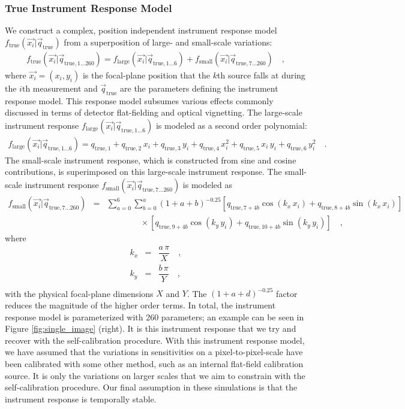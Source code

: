 \documentclass[preprint,pdftex]{aastex}
\newcommand{\true}{\text{true}}
\begin{document}
\subsubsection{True Instrument Response Model}
\label{sec:instrument_response_model}
We construct a complex, position independent instrument response model $f_\true(\vec{x_i} | \vec{q}_{\true})$ from a superposition of large- and small-scale variations:
\begin{eqnarray*}
f_\true(\vec{x_i} | \vec{q}_{\true, 1 \ldots 260}) = f_\text{large}(\vec{x_i} | \vec{q}_{\true, 1 \ldots 6}) + f_\text{small}(\vec{x_i} | \vec{q}_{\true, 7 \ldots 260}) \quad ,
\end{eqnarray*}
where $\vec{x_i} = (x_i, y_i)$ is the focal-plane position that the $k$th source falls at during the $i\text{th}$ measurement and $\vec{q}_\true$ are the parameters defining the instrument response model. This response model subsumes various effects commonly discussed in terms of detector flat-fielding and optical vignetting. The large-scale instrument response $f_\text{large}(\vec{x_i} | \vec{q}_{\true, 1 \ldots 6})$ is modeled as a second order polynomial:
\begin{eqnarray*}
f_\text{large}(\vec{x_i} | \vec{q}_{\true, 1 \ldots 6}) = q_{\true, 1} + q_{\true, 2} \, x_i + q_{\true, 3} \, y_i + q_{\true, 4} \, x_i^2 + q_{\true, 5} \, x_i \, y_i  + q_{\true, 6} \, y_i^2  \quad .
\end{eqnarray*}
The small-scale instrument response, which is constructed from sine and cosine contributions, is superimposed on this large-scale instrument response. The small-scale instrument response $f_\text{small}(\vec{x_i} | \vec{q}_{\true, 7 \ldots 260})$ is modeled as
\begin{eqnarray*}
f_\text{small}(\vec{x_i} | \vec{q}_{\true, 7\ldots 260})  & = &  \sum_{a=0}^6 \sum_{b=0}^a \left(1 + a + b\right) ^ {-0.25} \left[ q_{\true, 7+4b} \cos (k_x \, x_i) + q_{\true, 8+4b} \sin (k_x \, x_i) \right] \\
& & \qquad \qquad \times \left[ q_{\true, 9+4b} \cos (k_y \, y_i) + q_{\true, 10+4b} \sin (k_y \, y_i) \right] \quad ,
\end{eqnarray*}
where
\begin{eqnarray*}
k_x & = & \dfrac{a \, \pi}{X} \quad ,\\
k_y & = & \dfrac{b \, \pi}{Y} \quad ,\\
\end{eqnarray*}
with the physical focal-plane dimensions $X$ and $Y$. The $(1 + a +d)^{-0.25}$ factor reduces the magnitude of the higher order terms. In total, the instrument response model is parameterized with 260 parameters; an example can be seen in Figure \ref{fig:single_image} (right). It is this instrument response that we try and recover with the self-calibration procedure. With this instrument response model, we have assumed that the variations in sensitivities on a pixel-to-pixel-scale have been calibrated with some other method, such as an internal flat-field calibration source. It is only the variations on larger scales that we aim to constrain with the self-calibration procedure. Our final assumption in these simulations is that the instrument response is temporally stable. 
\end{document}

